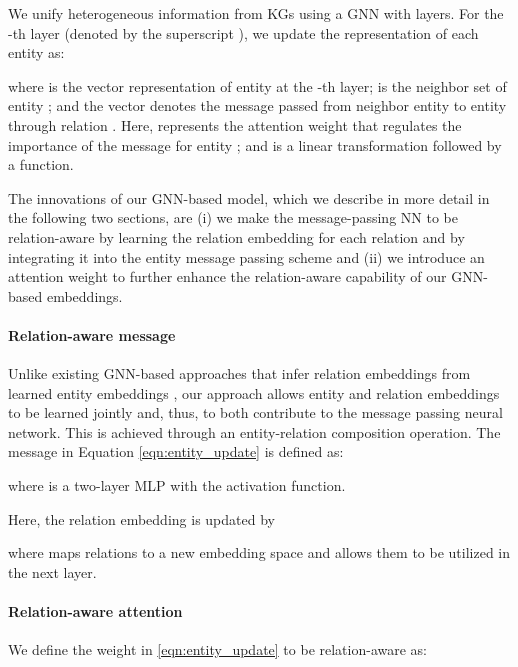 \documentclass[11pt]{article}
\begin{document}
We unify heterogeneous information from KGs using a GNN with  layers. For the -th layer (denoted by the superscript ), we update the representation  of each entity  as:

\setlength{\abovedisplayskip}{0pt}
\setlength{\belowdisplayskip}{5pt}


\noindent where  is the vector representation of entity  at the -th layer;  is the neighbor set of entity ; and the vector  denotes the message passed from neighbor entity  to entity  through relation . Here,   represents the attention weight that regulates the importance of the message  for entity ; and  is a linear transformation followed by a  function. 

The innovations of our GNN-based model, which we describe in more detail in the following two sections, are (i) we make the message-passing NN to be relation-aware by learning the relation embedding  for each relation  and by integrating it into the entity message passing scheme  and (ii) we introduce an attention weight  to further enhance the relation-aware capability of our GNN-based embeddings. 


\paragraph{Relation-aware message} Unlike existing GNN-based approaches that  infer relation embeddings from learned entity embeddings \cite{sun2020knowledge}, our approach allows entity and relation embeddings to be learned jointly and, thus, to both contribute to the message passing neural network. This is achieved through an entity-relation composition operation. The message  in Equation \ref{eqn:entity_update} is defined  as:





\noindent where  is a two-layer MLP with the  activation function.  

Here, the relation embedding is updated by



\noindent where  maps relations to a new embedding space and allows them to be utilized in the next layer. 


\paragraph{Relation-aware attention} We define the weight  in \autoref{eqn:entity_update} to be relation-aware as:

{\small

}
\end{document}
